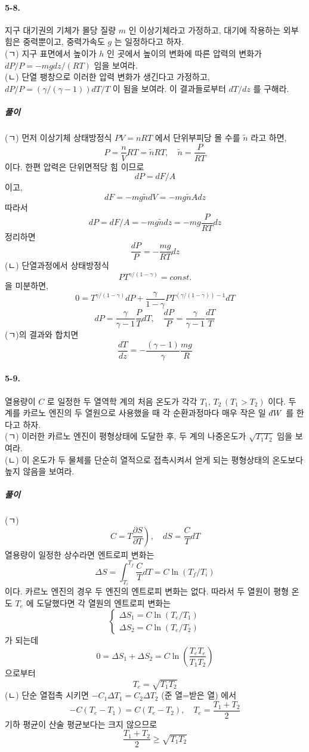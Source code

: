 \documentclass[a4paper,12pt]{report}
\newcommand{\Maxwell}[3][]{\left.\frac{\partial #2}{\partial #3} \right)_{#1} }
\newcommand{\dbar}{d\hspace*{-0.08em}\bar{}\hspace*{0.1em}}
\begin{document}
	\paragraph{5-8. } 지구 대기권의 기체가 몰당 질량 $m$ 인 이상기체라고 가정하고, 대기에 작용하는 외부 힘은 중력뿐이고, 중력가속도 $g$ 는 일정하다고 하자.\\
	(ㄱ) 지구 표면에서 높이가 $h$ 인 곳에서 높이의 변화에 따른 압력의 변화가 $dP/P=-mgdz/(RT)$ 임을 보여라.\\
	(ㄴ) 단열 팽창으로 이러한 압력 변화가 생긴다고 가정하고, $dP/P=(\gamma/(\gamma-1))dT/T$ 이 됨을 보여라. 이 결과들로부터 $dT/dz$ 를 구해라.
	\subparagraph{풀이 } (ㄱ) 먼저 이상기체 상태방정식 $PV=nRT$ 에서 단위부피당 몰 수를 $\tilde{n}$ 라고 하면, 
	$$P=\frac{n}{V}RT=\tilde{n}RT, \quad \tilde{n}=\frac{P}{RT}$$ 
	이다. 한편 압력은 단위면적당 힘 이므로
	$$dP=dF/A$$이고, $$dF=-mg\tilde{n}dV=-mg\tilde{n}Adz$$
	따라서 $$dP=dF/A=-mg\tilde{n}dz=-mg\frac{P}{RT}dz$$
	정리하면
	$$\frac{dP}{P}=-\frac{mg}{RT}dz$$
	(ㄴ) 단열과정에서 상태방정식
	$$PT^{\gamma/(1-\gamma)}=const.$$ 을 미분하면,
	$$0=T^{\gamma/(1-\gamma)}dP+\frac{\gamma}{1-\gamma}PT^{(\gamma/(1-\gamma))-1}dT$$
	$$dP=\frac{\gamma}{\gamma-1}\frac{P}{T}dT,\quad \frac{dP}{P}=\frac{\gamma}{\gamma-1}\frac{dT}{T}$$
	(ㄱ)의 결과와 합치면
	$$\frac{dT}{dz}=-\frac{(\gamma-1)}{\gamma}\frac{mg}{R}$$
	\paragraph{5-9. } 열용량이 $C$ 로 일정한 두 열역학 계의 처음 온도가 각각 $T_1,\,T_2\,(T_1>T_2)$ 이다. 두 계를 카르노 엔진의 두 열원으로 사용했을 때 각 순환과정마다 매우 작은 일 $\dbar W$ 를 한다고 하자.\\
	(ㄱ) 이러한 카르노 엔진이 평형상태에 도달한 후, 두 계의 나중온도가 $\sqrt{T_1T_2}$ 임을 보여라. \\
	(ㄴ) 이 온도가 두 물체를 단순히 열적으로 접촉시켜서 얻게 되는 평형상태의 온도보다 높지 않음을 보여라.
	\subparagraph{풀이} (ㄱ)$$C=T\Maxwell{S}{T},\quad dS=\frac{C}{T}dT$$
	열용량이 일정한 상수라면 엔트로피 변화는 
	$$\Delta S=\int_{T_i}^{T_f}\frac{C}{T}dT=C\ln(T_f/T_i)$$ 이다. 
	카르노 엔진의 경우 두 엔진의 엔트로피 변화는 없다. 따라서 두 열원이 평형 온도 $T_e$ 에 도달했다면 각 열원의 엔트로피 변화는 
	$$\begin{cases}
	\Delta S_1=C\ln(T_e/T_1)\\\Delta S_2=C\ln(T_e/T_2)
	\end{cases}$$
	가 되는데 
	$$0=\Delta S_1+\Delta S_2 =C\ln\left(\frac{T_eT_e}{T_1T_2} \right) $$ 으로부터
	$$T_e=\sqrt{T_1T_2}$$
	(ㄴ) 단순 열접촉 시키면 $-C_1\Delta T_1=C_2\Delta T_2$ (준 열=받은 열) 에서 
	$$-C(T_e-T_1)=C(T_e-T_2),\quad T_e=\frac{T_1+T_2}{2}$$
	기하 평균이 산술 평균보다는 크지 않으므로 
	$$\frac{T_1+T_2}{2}\ge\sqrt{T_1T_2}$$
\end{document}
